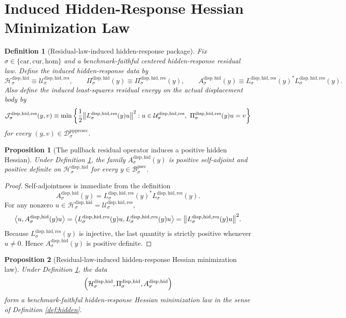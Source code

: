 \documentclass[11pt]{article}
\newcommand{\Car}{\mathrm{car}}
\newcommand{\Cur}{\mathrm{cur}}
\newcommand{\Hom}{\mathrm{hom}}
\newcommand{\ProtoSectionBody}[1]{\mathcal B_{#1}^{\mathrm{psec}}}
\newcommand{\PrePreProtoSectionResidualBody}[1]{\mathcal D_{#1}^{\mathrm{pppresec}}}
\newcommand{\HiddenCarrier}[1]{\mathcal H_{#1}^{\mathrm{disp,hid}}}
\newcommand{\HiddenReadout}[1]{\Pi_{#1}^{\mathrm{disp,hid}}}
\newcommand{\HiddenHessian}[1]{A_{#1}^{\mathrm{disp,hid}}}
\newcommand{\ResidualState}[1]{\mathcal U_{#1}^{\mathrm{disp,hid,res}}}
\newcommand{\ResidualReadout}[1]{\Pi_{#1}^{\mathrm{disp,hid,res}}}
\newcommand{\ResidualOperator}[1]{L_{#1}^{\mathrm{disp,hid,res}}}
\newcommand{\ResidualLeastSquares}[1]{\mathcal J_{#1}^{\mathrm{disp,hid,res}}}
\newtheorem{definition}{Definition}
\newtheorem{proposition}{Proposition}
\begin{document}
\section{Induced Hidden-Response Hessian Minimization Law}

\begin{definition}[Residual-law-induced hidden-response package]
\label{def:induced}
Fix \(\sigma\in\{\Car,\Cur,\Hom\}\) and a benchmark-faithful centered hidden-response residual law. Define the induced hidden-response data by
\[
\HiddenCarrier{\sigma}
\equiv
\ResidualState{\sigma},
\qquad
\HiddenReadout{\sigma}(y)
\equiv
\ResidualReadout{\sigma}(y),
\qquad
\HiddenHessian{\sigma}(y)
\equiv
\ResidualOperator{\sigma}(y)^*\ResidualOperator{\sigma}(y).
\]
Also define the induced least-squares residual energy on the actual displacement body by
\begin{equation}
\ResidualLeastSquares{\sigma}(y,v)
\equiv
\min\left\{
\frac{1}{2}\norm{\ResidualOperator{\sigma}(y)u}^{2}:
u\in\ResidualState{\sigma},
\ \ResidualReadout{\sigma}(y)u=v
\right\}
\label{eq:residualenergy}
\end{equation}
for every \((y,v)\in\PrePreProtoSectionResidualBody{\sigma}\).
\end{definition}

\begin{proposition}[The pullback residual operator induces a positive hidden Hessian]
\label{prop:pullback}
Under Definition \ref{def:induced}, the family \(\HiddenHessian{\sigma}(y)\) is positive self-adjoint and positive definite on \(\HiddenCarrier{\sigma}\) for every \(y\in\ProtoSectionBody{\sigma}\).
\end{proposition}

\begin{proof}
Self-adjointness is immediate from the definition
\[
\HiddenHessian{\sigma}(y)
=
\ResidualOperator{\sigma}(y)^*\ResidualOperator{\sigma}(y).
\]
For any nonzero \(u\in\HiddenCarrier{\sigma}=\ResidualState{\sigma}\),
\[
\ev{u,\HiddenHessian{\sigma}(y)u}
=
\ev{
\ResidualOperator{\sigma}(y)u,
\ResidualOperator{\sigma}(y)u
}
=
\norm{\ResidualOperator{\sigma}(y)u}^{2}.
\]
Because \(\ResidualOperator{\sigma}(y)\) is injective, the last quantity is strictly positive whenever \(u\neq 0\). Hence \(\HiddenHessian{\sigma}(y)\) is positive definite.
\end{proof}

\begin{proposition}[Residual-law-induced hidden-response Hessian minimization law]
\label{prop:hidden}
Under Definition \ref{def:induced}, the data
\[
\Bigl(
\HiddenCarrier{\sigma},
\HiddenReadout{\sigma},
\HiddenHessian{\sigma}
\Bigr)
\]
form a benchmark-faithful hidden-response Hessian minimization law in the sense of Definition \ref{def:hidden}.
\end{proposition}
\end{document}
